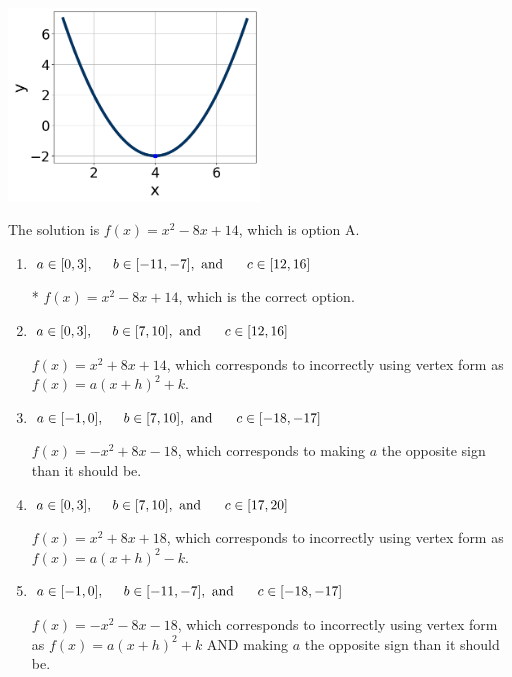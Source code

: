 \documentclass{extbook}[14pt]
\begin{document}
\begin{enumerate}
{\begin{center}
    \includegraphics[width=0.5\textwidth]{../Figures/quadraticGraphToEquationCopyA.png}
\end{center}


The solution is \( f(x) = x^{2} -8 x + 14 \), which is option A.\begin{enumerate}[label=\Alph*.]
\item \( a \in [0, 3], \hspace*{5mm} b \in [-11, -7], \text{ and } \hspace*{5mm} c \in [12, 16] \)

* $f(x)=x^{2} -8 x + 14$, which is the correct option.
\item \( a \in [0, 3], \hspace*{5mm} b \in [7, 10], \text{ and } \hspace*{5mm} c \in [12, 16] \)

$f(x)=x^{2} +8 x + 14$, which corresponds to incorrectly using vertex form as $f(x) = a(x+h)^2+k$.
\item \( a \in [-1, 0], \hspace*{5mm} b \in [7, 10], \text{ and } \hspace*{5mm} c \in [-18, -17] \)

$f(x)=-x^{2} +8 x -18$, which corresponds to making $a$ the opposite sign than it should be.
\item \( a \in [0, 3], \hspace*{5mm} b \in [7, 10], \text{ and } \hspace*{5mm} c \in [17, 20] \)

$f(x)=x^{2} +8 x + 18$, which corresponds to incorrectly using vertex form as $f(x) = a(x+h)^2 - k$.
\item \( a \in [-1, 0], \hspace*{5mm} b \in [-11, -7], \text{ and } \hspace*{5mm} c \in [-18, -17] \)

$f(x)=-x^{2} -8 x -18$, which corresponds to incorrectly using vertex form as $f(x) = a(x+h)^2+k$ AND making $a$ the opposite sign than it should be.
\end{enumerate}

}
\end{enumerate}
\end{document}

